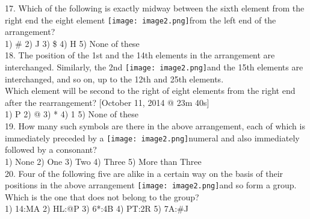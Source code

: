 \documentclass[
]{article}
\begin{document}
17. Which of the following is exactly midway between the sixth element from the right end the eight element \texttt{[image: image2.png]}from the left end of the arrangement?\\
1) \# \hspace{2mm}2) J \hspace{2mm}3) \$ \hspace{2mm}4) H \hspace{2mm}5) None of these\\

18. The position of the 1st and the 14th elements in the arrangement are interchanged. Similarly, the 2nd \texttt{[image: image2.png]}and the 15th elements are interchanged, and so on, up to the 12th and 25th elements.\\
Which element will be second to the right of eight elements from the right end after the rearrangement? [October 11, 2014 @ 23m 40s]\\
1) P \hspace{2mm}2) @ \hspace{2mm}3) * \hspace{2mm}4) 1 \hspace{2mm}5) None of these\\

19. How many such symbols are there in the above arrangement, each of which is immediately preceded by a \texttt{[image: image2.png]}numeral and also immediately followed by a consonant?\\
1) None \hspace{2mm}2) One \hspace{2mm}3) Two \hspace{2mm}4) Three \hspace{2mm}5) More than Three\\

20. Four of the following five are alike in a certain way on the basis of their positions in the above arrangement \texttt{[image: image2.png]}and so form a group. Which is the one that does not belong to the
group?\\
1) 14:MA \hspace{2mm}2) HL:@P \hspace{2mm}3) 6*:4B \hspace{2mm}4) PT:2R \hspace{2mm}5) 7A:\#J\\
\end{document}
